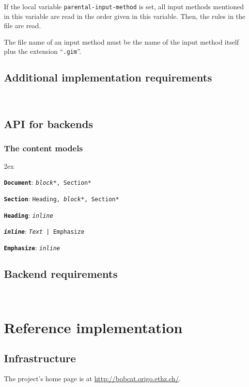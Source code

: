 \documentclass[12pt,openany]{book}
\begin{document}
If the local variable \verb|parental-input-method| is set, all input methods
mentioned in this variable are read in the order given in this variable.  Then,
the rules in the file are read.

The file name of an input method must be the name of the input method itself
plus the extension ``\verb|.gim|''.

\section{Additional implementation requirements}

~

\section{API for backends}

\subsection{The content models}

\begingroup\parindent0pt\parskip2ex
\newcommand{\element}[2]{\texttt{\textbf{#1}}: \texttt{#2}}

\element{Document}{\textit{block}*, Section*}

\element{Section}{Heading, \textit{block}*, Section*}

\element{Heading}{\textit{inline}}

\element{\textit{inline}}{\textit{Text} | Emphasize}

\element{Emphasize}{\textit{inline}}

\endgroup

\section{Backend requirements}

~


\chapter{Reference implementation}

\section{Infrastructure}

The project's home page is at \url{http://bobcat.origo.ethz.ch/}.
\end{document}

